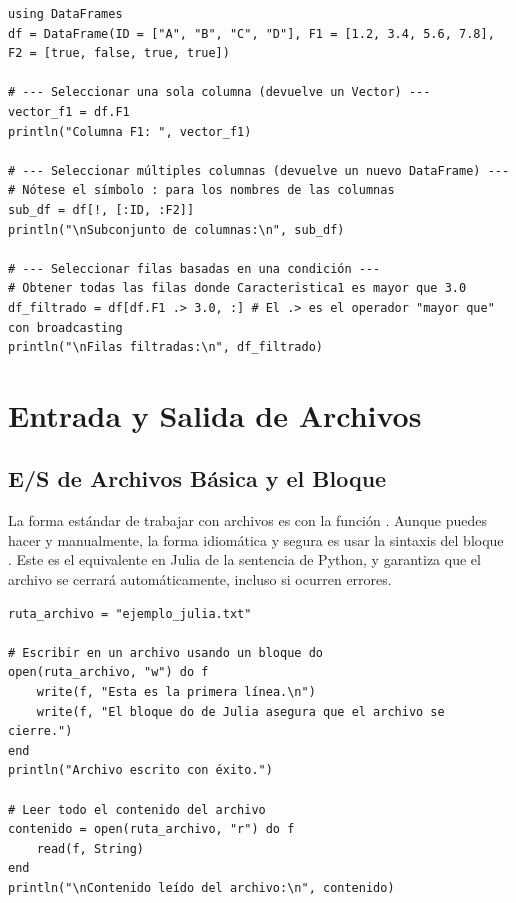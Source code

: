 \begin{example}
\text{ }\begin{verbatim}
using DataFrames
df = DataFrame(ID = ["A", "B", "C", "D"], F1 = [1.2, 3.4, 5.6, 7.8], F2 = [true, false, true, true])

# --- Seleccionar una sola columna (devuelve un Vector) ---
vector_f1 = df.F1
println("Columna F1: ", vector_f1)

# --- Seleccionar múltiples columnas (devuelve un nuevo DataFrame) ---
# Nótese el símbolo : para los nombres de las columnas
sub_df = df[!, [:ID, :F2]]
println("\nSubconjunto de columnas:\n", sub_df)

# --- Seleccionar filas basadas en una condición ---
# Obtener todas las filas donde Caracteristica1 es mayor que 3.0
df_filtrado = df[df.F1 .> 3.0, :] # El .> es el operador "mayor que" con broadcasting
println("\nFilas filtradas:\n", df_filtrado)
\end{verbatim}
\end{example}

\section{Entrada y Salida de Archivos}
\label{sec:julia_files}

\subsection*{E/S de Archivos Básica y el Bloque }
La forma estándar de trabajar con archivos es con la función . Aunque puedes hacer  y  manualmente, la forma idiomática y segura es usar la sintaxis del bloque \textbf{}. Este es el equivalente en Julia de la sentencia  de Python, y garantiza que el archivo se cerrará automáticamente, incluso si ocurren errores.

\begin{example}
\text{ }\begin{verbatim}
ruta_archivo = "ejemplo_julia.txt"

# Escribir en un archivo usando un bloque do
open(ruta_archivo, "w") do f
    write(f, "Esta es la primera línea.\n")
    write(f, "El bloque do de Julia asegura que el archivo se cierre.")
end
println("Archivo escrito con éxito.")

# Leer todo el contenido del archivo
contenido = open(ruta_archivo, "r") do f
    read(f, String)
end
println("\nContenido leído del archivo:\n", contenido)
\end{verbatim}
\end{example}

